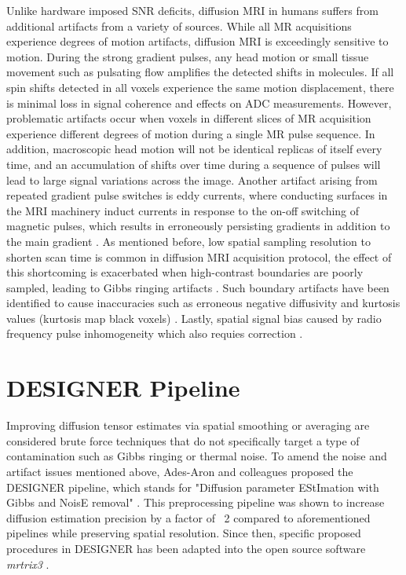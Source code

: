 Unlike hardware imposed SNR deficits, diffusion MRI in humans suffers from additional artifacts from a variety of sources. While all MR acquisitions experience degrees of motion artifacts, diffusion MRI is exceedingly sensitive to motion. During  the strong gradient pulses, any head motion or small tissue movement such as pulsating flow amplifies the detected shifts in molecules. If all spin shifts detected in all voxels experience the same motion displacement, there is minimal loss in signal coherence and effects on ADC measurements. However, problematic artifacts occur when voxels in different slices of MR acquisition experience different degrees of motion during a single MR pulse sequence. In addition, macroscopic head motion will not be identical replicas of itself every time, and an accumulation of shifts over time during a sequence of pulses will lead to large signal variations across the image\cite{le_bihan_artifacts_2006}. Another artifact arising from repeated gradient pulse switches is eddy currents, where conducting surfaces in the MRI machinery induct currents in response to the on-off switching of magnetic pulses, which results in erroneously persisting gradients in addition to the main gradient \cite{andersson_model-based_2002,andersson_integrated_2016}. As mentioned before, low spatial sampling resolution to shorten scan time is common in diffusion MRI acquisition protocol, the effect of this shortcoming is exacerbated when high-contrast boundaries are poorly sampled, leading to Gibbs ringing artifacts \cite{veraart_gibbs_2016,wheeler_2021,tournier_diffusion_2011}. Such boundary artifacts have been identified to cause inaccuracies such as erroneous negative diffusivity and kurtosis values (kurtosis map black voxels) \cite{veraart_gibbs_2016,kellner_gibbs-ringing_2016,perrone_effect_2015}. Lastly, spatial signal bias caused by radio frequency pulse inhomogeneity which also requies correction \cite{bernstein_imaging_2006,belaroussi_intensity_2006}. 

\section{DESIGNER Pipeline}
Improving diffusion tensor estimates via spatial smoothing \cite{tabesh_estimation_2011} or averaging \cite{cui_panda_2013} are considered brute force techniques that do not specifically target a type of contamination such as Gibbs ringing or thermal noise. To amend the noise and artifact issues mentioned above, Ades-Aron and colleagues proposed the DESIGNER pipeline, which stands for "Diffusion parameter EStImation with Gibbs and NoisE removal" \cite{ades-aron_evaluation_2018}. This preprocessing pipeline was shown to increase diffusion estimation precision by a factor of ~2 compared to aforementioned pipelines while preserving spatial resolution. Since then, specific proposed procedures in DESIGNER has been adapted into the open source software \emph{mrtrix3} \cite{tournier_mrtrix3_2019}. 

